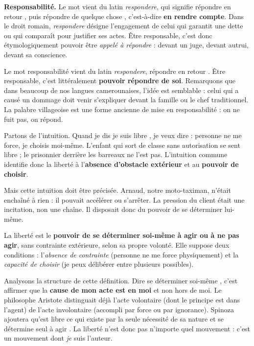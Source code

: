 \documentclass[11pt]{article}
\newcommand{\cle}[1]{{\popxbold\color{popdark}#1}}
\newcounter{popsec}
\newcounter{popsub}
\newcommand{\courssub}[1]{%
  \stepcounter{popsub}%
  \par\vspace{9pt}\noindent{\popxbold\fontsize{11.5}{13}\selectfont\color{popink}{\color{poporange}\thepopsec.\thepopsub}\hspace{6pt}#1}\par\nopagebreak\vspace{4pt}
}
\begin{document}
\textbf{Responsabilité.} Le mot vient du latin \emph{respondere}, qui signifie \og répondre en retour \fg{}, puis \og répondre de quelque chose \fg{}, c'est-à-dire \textbf{en rendre compte}. Dans le droit romain, \emph{respondere} désigne l'engagement de celui qui garantit une dette ou qui comparaît pour justifier ses actes. Être responsable, c'est donc étymologiquement pouvoir être \emph{appelé à répondre} : devant un juge, devant autrui, devant sa conscience.

\begin{savaistu}
Le mot \og responsabilité \fg{} vient du latin \emph{respondere}, \og répondre en retour \fg{}. Être responsable, c'est littéralement \textbf{pouvoir répondre de soi}. Remarquons que dans beaucoup de nos langues camerounaises, l'idée est semblable : celui qui a causé un dommage doit \og venir s'expliquer \fg{} devant la famille ou le chef traditionnel. La palabre villageoise est une forme ancienne de mise en responsabilité : on ne fuit pas, on répond.
\end{savaistu}

\courssub{Définition de la liberté}

Partons de l'intuition. Quand je dis \og je suis libre \fg{}, je veux dire : personne ne me force, je choisis moi-même. L'enfant qui sort de classe sans autorisation se sent libre ; le prisonnier derrière les barreaux ne l'est pas. L'intuition commune identifie donc la liberté à l'\textbf{absence d'obstacle extérieur} et au \textbf{pouvoir de choisir}.

Mais cette intuition doit être précisée. Arnaud, notre moto-taximan, n'était enchaîné à rien : il pouvait accélérer ou s'arrêter. La pression du client était une incitation, non une chaîne. Il disposait donc du pouvoir de se déterminer lui-même.

\begin{definition}[La liberté]
La \cle{liberté} est le \textbf{pouvoir de se déterminer soi-même à agir ou à ne pas agir}, sans contrainte extérieure, selon sa propre volonté. Elle suppose deux conditions : l'\emph{absence de contrainte} (personne ne me force physiquement) et la \emph{capacité de choisir} (je peux délibérer entre plusieurs possibles).
\end{definition}

Analysons la structure de cette définition. Dire \og se déterminer soi-même \fg{}, c'est affirmer que la \textbf{cause de mon acte est en moi} et non hors de moi. Le philosophe Aristote distinguait déjà l'acte volontaire (dont le principe est dans l'agent) de l'acte involontaire (accompli par force ou par ignorance). Spinoza ajoutera qu'est libre ce qui \og existe par la seule nécessité de sa nature et se détermine seul à agir \fg{}. La liberté n'est donc pas n'importe quel mouvement : c'est un mouvement dont \emph{je} suis l'auteur.
\end{document}

